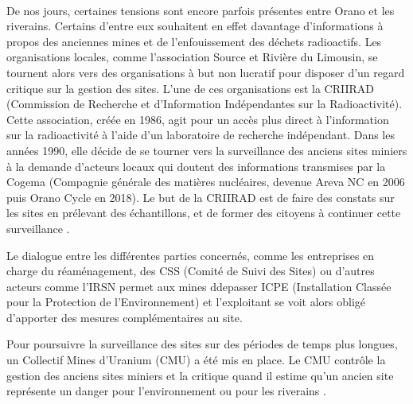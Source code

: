 \documentclass{article}
\begin{document}
\paragraph{} De nos jours, certaines tensions sont encore parfois présentes entre Orano et les riverains. Certains d'entre eux souhaitent en effet davantage d’informations à propos des anciennes mines et de l'enfouissement des déchets radioactifs. Les organisations locales, comme l’association Source et Rivière du Limousin, se tournent alors vers des organisations à but non lucratif pour disposer d'un regard critique sur la gestion des sites. 
L’une de ces organisations est la CRIIRAD (Commission de Recherche et d'Information Indépendantes sur la Radioactivité). Cette association, créée en 1986, agit pour un accès plus direct à l’information sur la radioactivité à l’aide d’un laboratoire de recherche indépendant. Dans les années 1990, elle décide de se tourner vers la surveillance des anciens sites miniers à la demande d’acteurs locaux qui doutent des informations transmises par la Cogema (Compagnie générale des matières nucléaires, devenue Areva NC en 2006 puis Orano Cycle en 2018). Le but de la CRIIRAD est de faire des constats sur les sites en prélevant des échantillons, et de former des citoyens à continuer cette surveillance \cite{ina.fr_dossier_nodate} \cite{chareyron_limpact_2005}. 

Le dialogue entre les différentes parties concernés, comme les entreprises en charge du réaménagement, des CSS (Comité de Suivi des Sites) ou d’autres acteurs comme l’IRSN permet aux mines ddepasser ICPE (Installation Classée pour la Protection de l'Environnement) et l’exploitant se voit alors obligé d’apporter des mesures complémentaires au site.

Pour poursuivre la surveillance des sites sur des périodes de temps plus longues, un Collectif Mines d’Uranium (CMU) a été mis en place. Le CMU contrôle la gestion des anciens sites miniers et la critique quand il estime qu'un ancien site représente un danger pour l'environnement ou pour les riverains \cite{noauthor_collectif_nodate}.

\end{document}
